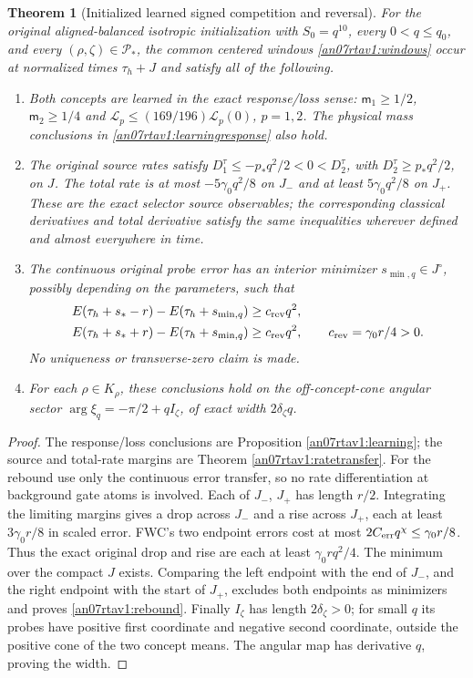 \documentclass[11pt]{article}
\numberwithin{equation}{section}
\newtheorem{theorem}{Theorem}[section]
\begin{document}
\begin{theorem}[Initialized learned signed competition and reversal]
\label{an07rtav1:theoremA}
For the original aligned-balanced isotropic initialization with
\(S_0=q^{10}\), every \(0<q\le q_0\), and every
\((\rho,\zeta)\in\mathcal P_*\), the common centered windows
\eqref{an07rtav1:windows} occur at normalized times \(\tau_h+J\)
and satisfy all of the following.
\begin{enumerate}
\item Both concepts are learned in the exact response/loss sense:
 \(\mathsf m_1\ge1/2\), \(\mathsf m_2\ge1/4\) and
 \(\mathcal L_p\le(169/196)\mathcal L_p(0)\), \(p=1,2\).
 The physical mass conclusions in
 \eqref{an07rtav1:learningresponse} also hold.
\item The original source rates satisfy
 \(D_1^\tau\le-p_*q^2/2<0<D_2^\tau\), with
 \(D_2^\tau\ge p_*q^2/2\), on \(J\).
 The total rate is at most \(-5\gamma_0q^2/8\) on \(J_-\)
 and at least \(5\gamma_0q^2/8\) on \(J_+\).
 These are the exact selector source observables; the corresponding
 classical derivatives and total derivative satisfy the same
 inequalities wherever defined and almost everywhere in time.
\item The continuous original probe error has an interior minimizer
 \(s_{\min,q}\in J^\circ\), possibly depending on the parameters,
 such that
 \begin{align}
 E(\tau_h+s_*-r)-E(\tau_h+s_{\min,q})
                &\ge c_{\rm rev}q^2,\notag\\
 E(\tau_h+s_*+r)-E(\tau_h+s_{\min,q})
                &\ge c_{\rm rev}q^2,\qquad
 c_{\rm rev}=\gamma_0r/4>0.
 \label{an07rtav1:rebound}
 \end{align}
 No uniqueness or transverse-zero claim is made.
\item For each \(\rho\in K_\rho\), these conclusions hold on the
 off-concept-cone angular sector
 \(\arg\xi_q=-\pi/2+qI_\zeta\), of exact width
 \(2\delta_\zeta q\).
\end{enumerate}
\end{theorem}
\begin{proof}
The response/loss conclusions are Proposition
\ref{an07rtav1:learning}; the source and total-rate margins are
Theorem \ref{an07rtav1:ratetransfer}. For the rebound use only
the continuous error transfer, so no rate differentiation at
background gate atoms is involved.
Each of \(J_-\), \(J_+\) has length \(r/2\). Integrating the
limiting margins gives a drop across \(J_-\) and a rise across
\(J_+\), each at least \(3\gamma_0r/8\) in scaled error.
FWC's two endpoint errors cost at most
\(2C_{\rm err}q^\chi\le\gamma_0r/8\). Thus the exact original
drop and rise are each at least \(\gamma_0rq^2/4\).
The minimum over the compact \(J\) exists. Comparing the left
endpoint with the end of \(J_-\), and the right endpoint with
the start of \(J_+\), excludes both endpoints as minimizers
and proves \eqref{an07rtav1:rebound}.
Finally \(I_\zeta\) has length \(2\delta_\zeta>0\); for small
\(q\) its probes have positive first coordinate and negative
second coordinate, outside the positive cone of the two concept
means. The angular map has derivative \(q\), proving the width.
\end{proof}
\end{document}
